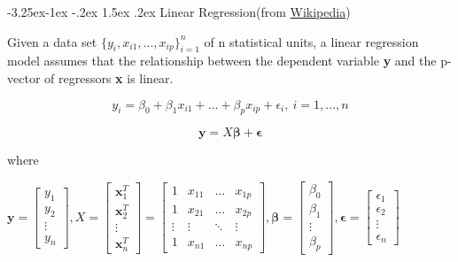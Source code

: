 \documentclass{article}
\makeatletter
\renewcommand\paragraph{\@startsection{paragraph}{4}{\z@}%
                                     {-3.25ex\@plus -1ex \@minus -.2ex}%
                                     {1.5ex \@plus .2ex}%
                                     {\normalfont\normalsize\bfseries}}
\makeatother
\begin{document}
\paragraph{Linear Regression(from \href{https://en.wikipedia.org/wiki/Linear_regression\#:~:text=In\%20statistics\%2C\%20linear\%20regression\%20is,is\%20called\%20simple\%20linear\%20regression.}{Wikipedia})}

Given a data set \(\{y_i, x_{i1}, ..., x_{ip}\}_{i=1}^n\) of n statistical units, a linear regression model assumes that the relationship between the dependent variable \textbf{y} and the p-vector of regressors \textbf{x} is linear.

\[y_i = \beta_0 + \beta_{1}x_{i1} + \dots + \beta_{p}x_{ip} + \epsilon_i, \: i = 1, \dots, n\]

\[\textbf{y} = X\boldsymbol{\beta} + \boldsymbol{\epsilon}\]

\noindent where

\bigskip

\(
\textbf{y} = 
\begin{bmatrix}
y_1\\
y_2\\
\vdots\\
y_n
\end{bmatrix}
,
X = 
\begin{bmatrix}
\textbf{x}_1^T\\
\textbf{x}_2^T\\
\vdots\\
\textbf{x}_n^T
\end{bmatrix} = 
\begin{bmatrix}
1 & x_{11} & \dots & x_{1p}\\
1 & x_{21} & \dots & x_{2p}\\
\vdots & \vdots & \ddots & \vdots\\
1 & x_{n1} & \dots & x_{np}
\end{bmatrix}
,
\boldsymbol{\beta} = 
\begin{bmatrix}
\beta_0\\
\beta_1\\
\vdots\\
\beta_p
\end{bmatrix}
,
\boldsymbol{\epsilon} = 
\begin{bmatrix}
\epsilon_1\\
\epsilon_2\\
\vdots\\
\epsilon_n
\end{bmatrix}
\)

\bigskip
\end{document}
